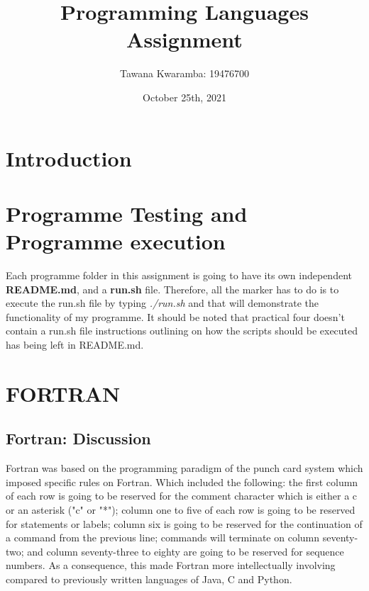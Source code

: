 \documentclass[
	12pt, %
]{fphw}
\title{Programming Languages Assignment} %
\author{Tawana Kwaramba: 19476700} %
\date{October 25th, 2021} %
\institute{Curtin University \\ Faculty of Science and Engineering: School of Electrical Engineering, computing and Math Science} %
\begin{document}
\maketitle
\newpage
\tableofcontents
\newpage
\listoffigures
\listoftables
\newpage
\section{Introduction}

\section{Programme Testing and Programme execution}
Each programme folder in this assignment is going to have its own independent
\textbf{README.md}, and a \textbf{run.sh} file. Therefore, all the marker has to
do is to execute the run.sh file by typing \emph{./run.sh} and that will demonstrate
the functionality of my programme. It should be noted that practical
four doesn't contain a run.sh file instructions outlining on how the scripts
should be executed has being left in README.md.

\section{FORTRAN}
\subsection{Fortran: Discussion}
Fortran was based on the programming paradigm of the punch card system which imposed specific
rules on Fortran. Which included the following: the first column of each row is going to be reserved for
the comment character which is either a c or an asterisk ("c" or "*"); column one to five of each row
is going to be reserved for statements or labels; column six is going to be
reserved for the continuation of a command from the previous line; commands will
terminate on column seventy-two; and column seventy-three
to eighty are going to be reserved for sequence numbers. As a consequence, this
made Fortran more intellectually involving compared to previously written
languages of Java, C and Python. \par
\end{document}
